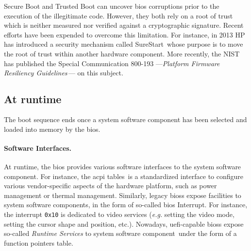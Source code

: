 Secure Boot and Trusted Boot can uncover \ac{bios} corruptions prior to the
execution of the illegitimate code.
%
However, they both rely on a root of trust which is neither measured nor
verified against a cryptographic signature. 
%
Recent efforts have been expended to overcome this limitation.
%
For instance, in 2013 HP has introduced a security mechanism called
SureStart\,\cite{hp2016surestart} whose purpose is to move the root of trust
within another hardware component. 
%
More recently, the NIST has published the Special Communication 800-193
---\emph{Platform Firmware Resiliency
  Guidelines}\,\cite{regenscheid2018nist800193}--- on this subject. 

\subsection{At runtime}
\label{subsec:usecase:firm:runtime}

The boot sequence ends once a system software component has been selected and
loaded into memory by the \ac{bios}.

\paragraph{Software Interfaces.}
At runtime, the \ac{bios} provides various software interfaces to the system
software component.
%
For instance, the \ac{acpi} tables\,\cite{uefi2017acpi,duflot2010acpi} is a
standardized interface to configure various vendor-specific aspects of the
hardware platform, such as power management or thermal management.
%
Similarly, legacy \acp{bios} expose facilities to system software components, in
the form of so-called \ac{bios} Interrupt.
%
For instance, the interrupt \texttt{0x10} is dedicated to video services
(\emph{e.g.} setting the video mode, setting the cursor shape and position,
etc.).
%
Nowadays, \ac{uefi}-capable \acp{bios} expose so-called \emph{Runtime Services}
to system software component\,\cite[Chapter 5]{zimmer2017uefi} under the form of
a function pointers table.

